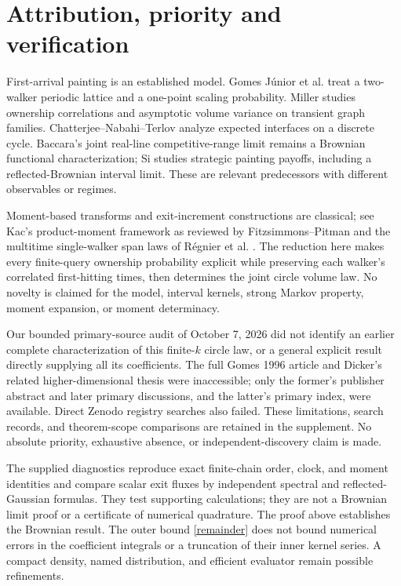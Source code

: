 \documentclass[11pt]{article}
\begin{document}
\section{Attribution, priority and verification}
First-arrival painting is an established model. Gomes J\'unior et al.
\cite{Gomes} treat a two-walker periodic lattice and a one-point
scaling probability. Miller \cite{Miller} studies ownership correlations
and asymptotic volume variance on transient graph families.
Chatterjee--Nabahi--Terlov \cite{Chatterjee} analyze expected interfaces
on a discrete cycle. Baccara's joint real-line competitive-range limit
\cite[Section~6, Proposition~8]{Baccara} remains a Brownian functional
characterization; Si \cite{Si} studies strategic painting payoffs,
including a reflected-Brownian interval limit. These are relevant
predecessors with different observables or regimes.

Moment-based transforms and exit-increment constructions are classical;
see Kac's product-moment framework as reviewed by Fitzsimmons--Pitman
\cite{FitzsimmonsPitman} and the multitime single-walker span laws of
R\'egnier et al. \cite{Regnier}. The reduction here makes every
finite-query ownership probability explicit while preserving each
walker's correlated first-hitting times, then determines the joint
circle volume law. No novelty is claimed for the model, interval
kernels, strong Markov property, moment expansion, or moment determinacy.

Our bounded primary-source audit of October 7, 2026 did not identify
an earlier complete characterization of this finite-$k$ circle law,
or a general explicit result directly supplying all its coefficients.
The full Gomes 1996 article and Dicker's related higher-dimensional
thesis \cite{Dicker} were inaccessible; only the former's publisher abstract and
later primary discussions, and the latter's primary index, were
available. Direct Zenodo registry searches also failed. These
limitations, search records, and theorem-scope comparisons are retained
in the supplement. No absolute priority, exhaustive absence, or
independent-discovery claim is made.

The supplied diagnostics reproduce exact finite-chain order, clock,
and moment identities and compare scalar exit fluxes by independent
spectral and reflected-Gaussian formulas. They test supporting
calculations; they are not a Brownian limit proof or a certificate of
numerical quadrature. The proof above establishes the Brownian result.
The outer bound \eqref{remainder} does not bound numerical errors in
the coefficient integrals or a truncation of their inner kernel series.
A compact density, named distribution, and efficient evaluator remain
possible refinements.
\end{document}
